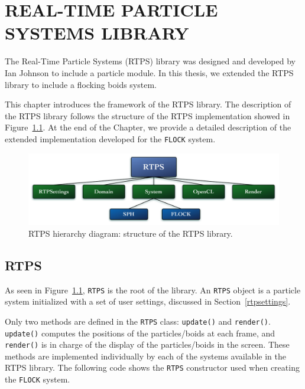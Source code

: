 \chapter{REAL-TIME PARTICLE SYSTEMS LIBRARY}\label{RTPSchapter}

The Real-Time Particle Systems (RTPS) library was designed and developed by Ian Johnson\cite{ianPaper} to include a particle module. In this thesis, we extended the RTPS library to include a flocking boids system. 

This chapter introduces the framework of the RTPS library. The description of the RTPS library follows the structure of the RTPS implementation showed in Figure~\ref{RTPSdiagram}. At the end of the Chapter, we provide a detailed description of the extended implementation developed for the \texttt{FLOCK} system.

\begin{figure}[htbp]
\begin{center}
\includegraphics[scale=0.38]{figures/RTPSdiagramMyrna.pdf}
\caption{RTPS hierarchy diagram: structure of the RTPS library.}
\label{RTPSdiagram}
\end{center}
\end{figure}

\section{RTPS}\label{rtpssection}
As seen in Figure~\ref{RTPSdiagram}, \texttt{RTPS} is the root of the library. An \texttt{RTPS} object is a particle system initialized with a set of user settings,  discussed in Section~\ref{rtpsettings}. 

Only two methods are defined in the \texttt{RTPS} class: \texttt{update()} and \texttt{render()}. \texttt{update()} computes the positions of the particles/boids at each frame, and \texttt{render()} is in charge of the display of the particles/boids in the screen. These methods are implemented individually by each of the systems available in the RTPS library. The following code shows the \texttt{RTPS} constructor used when creating the \texttt{FLOCK} system.


